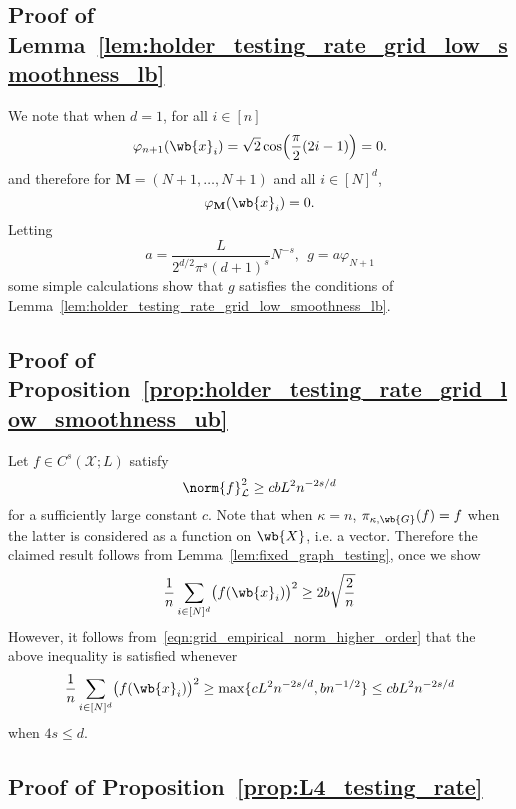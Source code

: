 \documentclass{article}
\newcommand{\1}{\mathbf{1}}
\newcommand{\Xset}{\mathcal{X}}
\newcommand{\Leb}{\mathcal{L}}
\theoremstyle{alden}
\theoremstyle{aldenthm}
\theoremstyle{definition}
\theoremstyle{remark}
\begin{document}
\subsection{Proof of Lemma~\ref{lem:holder_testing_rate_grid_low_smoothness_lb}}
We note that when $d = 1$, for all $i \in [n]$
\begin{equation*}
\varphi_{n + 1}(\wb{x}_i) = \sqrt{2}\cos\Bigl(\frac{\pi}{2}(2i - 1)\Bigr) = 0.
\end{equation*}
and therefore for $\mathbf{M} = (N + 1,\ldots,N + 1)$ and all $i \in [N]^d$,
\begin{equation*}
\varphi_{\mathbf{M}}(\wb{x}_i) = 0.
\end{equation*}
Letting 
\begin{equation*}
a = \frac{L}{2^{d/2}\pi^s(d+1)^s}N^{-s},~~ g = a \varphi_{N+1}
\end{equation*}
some simple calculations show that $g$ satisfies the conditions of Lemma~\ref{lem:holder_testing_rate_grid_low_smoothness_lb}.

\subsection{Proof of Proposition~\ref{prop:holder_testing_rate_grid_low_smoothness_ub}}
Let $f \in C^s(\Xset;L)$ satisfy
\begin{equation*}
\norm{f}_{\Leb}^2 \geq c b L^2 n^{-2s/d}
\end{equation*}
for a sufficiently large constant $c$. Note that when $\kappa = n$, $\pi_{\kappa,\wb{G}}(f) = f$ when the latter is considered as a function on $\wb{X}$, i.e. a vector. Therefore the claimed result follows from Lemma~\ref{lem:fixed_graph_testing}, once we show
\begin{equation*}
\frac{1}{n} \sum_{i \in [N]^d} \bigl(f(\wb{x}_i)\bigr)^2 \geq 2b \sqrt{\frac{2}{n}}
\end{equation*}
However, it follows from~\eqref{eqn:grid_empirical_norm_higher_order} that the above inequality is satisfied whenever
\begin{equation*}
\frac{1}{n} \sum_{i \in [N]^d} \bigl(f(\wb{x}_i)\bigr)^2 \geq \max\{c L^2 n^{-2s/d}, b n^{-1/2}\} \leq c b L^2 n^{-2s/d}
\end{equation*}
when $4s \leq d$.



\clearpage


\subsection{Proof of Proposition~\ref{prop:L4_testing_rate}}
\end{document}
